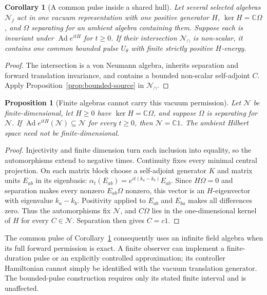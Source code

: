 \documentclass[12pt]{article}
\newtheorem{proposition}[theorem]{Proposition}
\newtheorem{corollary}[theorem]{Corollary}
\theoremstyle{definition}
\theoremstyle{remark}
\begin{document}
\begin{corollary}[A common pulse inside a shared hull]\label{cor:shared-pulse}
Let several selected algebras \(\mathcal N_j\) act in one vacuum representation
with one positive generator \(H\), \(\ker H=\mathbb C\Omega\), and \(\Omega\)
separating for an ambient algebra containing them. Suppose each is invariant
under \(\operatorname{Ad}e^{itH}\) for \(t\ge0\). If their intersection
\(\mathcal N_\cap\) is non-scalar, it contains one common bounded pulse
\(U_\theta\) with finite strictly positive \(H\)-energy.
\end{corollary}
\begin{proof}
The intersection is a von Neumann algebra, inherits separation and forward
translation invariance, and contains a bounded non-scalar self-adjoint \(C\).
Apply Proposition~\ref{prop:bounded-source} in \(\mathcal N_\cap\).
\end{proof}

\begin{proposition}[Finite algebras cannot carry this vacuum permission]
\label{prop:finite-vacuum-permission}
Let $\mathcal N$ be finite-dimensional, let $H\ge0$ have
$\ker H=\mathbb C\Omega$, and suppose $\Omega$ is separating for
$\mathcal N$. If $\operatorname{Ad}e^{itH}(\mathcal N)\subseteq
\mathcal N$ for every $t\ge0$, then $\mathcal N=\mathbb C1$.
The ambient Hilbert space need not be finite-dimensional.
\end{proposition}
\begin{proof}
Injectivity and finite dimension turn each inclusion into equality, so
the automorphisms extend to negative times. Continuity fixes every
minimal central projection. On each matrix block choose a self-adjoint
generator $K$ and matrix units $E_{ab}$ in its eigenbasis:
$\alpha_t(E_{ab})=e^{it(k_a-k_b)}E_{ab}$.
Since $H\Omega=0$ and separation makes every nonzero $E_{ab}\Omega$
nonzero, this vector is an $H$-eigenvector with eigenvalue $k_a-k_b$.
Positivity applied to $E_{ab}$ and $E_{ba}$ makes all differences zero.
Thus the automorphisms fix $\mathcal N$, and $C\Omega$ lies in the
one-dimensional kernel of $H$ for every $C\in\mathcal N$. Separation
then gives $C=c1$.
\end{proof}

The common pulse of Corollary~\ref{cor:shared-pulse} consequently uses
an infinite field algebra when its full forward permission is exact.
A finite observer can implement a finite-duration pulse or an explicitly
controlled approximation; its controller Hamiltonian cannot simply be
identified with the vacuum translation generator. The bounded-pulse
construction requires only its stated finite interval and is unaffected.
\end{document}
